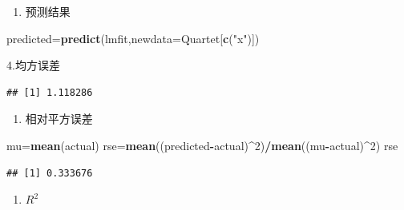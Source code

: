 \documentclass[
]{article}
\newenvironment{Shaded}{\begin{snugshade}}{\end{snugshade}}
\newcommand{\DataTypeTok}[1]{\textcolor[rgb]{0.13,0.29,0.53}{#1}}
\newcommand{\DecValTok}[1]{\textcolor[rgb]{0.00,0.00,0.81}{#1}}
\newcommand{\FloatTok}[1]{\textcolor[rgb]{0.00,0.00,0.81}{#1}}
\newcommand{\KeywordTok}[1]{\textcolor[rgb]{0.13,0.29,0.53}{\textbf{#1}}}
\newcommand{\NormalTok}[1]{#1}
\newcommand{\OperatorTok}[1]{\textcolor[rgb]{0.81,0.36,0.00}{\textbf{#1}}}
\newcommand{\StringTok}[1]{\textcolor[rgb]{0.31,0.60,0.02}{#1}}
\providecommand{\tightlist}{%
  \setlength{\itemsep}{0pt}\setlength{\parskip}{0pt}}
\begin{document}
\begin{enumerate}
\def\labelenumi{\arabic{enumi}.}
\setcounter{enumi}{2}
\tightlist
\item
  预测结果
\end{enumerate}

\begin{Shaded}
\begin{Highlighting}[]
\NormalTok{predicted=}\KeywordTok{predict}\NormalTok{(lmfit,}\DataTypeTok{newdata=}\NormalTok{Quartet[}\KeywordTok{c}\NormalTok{(}\StringTok{"x"}\NormalTok{)])}
\end{Highlighting}
\end{Shaded}

4.均方误差

\begin{Shaded}
\end{Shaded}

\begin{verbatim}
## [1] 1.118286
\end{verbatim}

\begin{enumerate}
\def\labelenumi{\arabic{enumi}.}
\setcounter{enumi}{4}
\tightlist
\item
  相对平方误差
\end{enumerate}

\begin{Shaded}
\begin{Highlighting}[]
\NormalTok{mu=}\KeywordTok{mean}\NormalTok{(actual)}
\NormalTok{rse=}\KeywordTok{mean}\NormalTok{((predicted}\OperatorTok{-}\NormalTok{actual)}\OperatorTok{^}\DecValTok{2}\NormalTok{)}\OperatorTok{/}\KeywordTok{mean}\NormalTok{((mu}\OperatorTok{-}\NormalTok{actual)}\OperatorTok{^}\DecValTok{2}\NormalTok{)}
\NormalTok{rse}
\end{Highlighting}
\end{Shaded}

\begin{verbatim}
## [1] 0.333676
\end{verbatim}

\begin{enumerate}
\def\labelenumi{\arabic{enumi}.}
\setcounter{enumi}{5}
\tightlist
\item
  \(R^2\)
\end{enumerate}
\end{document}
